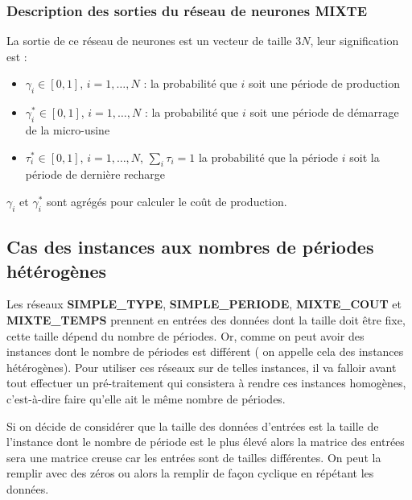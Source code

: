 \subsubsection{Description des sorties du réseau de neurones \textbf{MIXTE}}
La sortie de ce réseau de neurones est un vecteur de taille $3N$, leur signification est :
\begin{itemize}[label=$\square$]
	\item $\gamma_i\in [0,1]$, $i=1, \dots, N$ : la probabilité que $i$ soit une période de production
	\item $\gamma_i^*\in [0,1]$, $i=1, \dots, N$ : la probabilité que $i$ soit une période de démarrage de la micro-usine 
	\item $\tau_i^*\in [0,1]$, $i=1, \dots, N$, $\sum_i \tau_i=1$ la probabilité que la période $i$ soit la période de dernière recharge
\end{itemize}
$\gamma_i$ et $\gamma_i^*$ sont agrégés pour calculer le coût de production.

\subsection{Cas des instances aux nombres de périodes hétérogènes}

Les réseaux \textbf{SIMPLE\_TYPE}, \textbf{SIMPLE\_PERIODE}, \textbf{MIXTE\_COUT} et \textbf{MIXTE\_TEMPS} prennent en entrées des données dont la taille doit être fixe, cette taille dépend du nombre de périodes. Or, comme on peut avoir des instances dont le nombre de périodes est différent ( on appelle cela des instances hétérogènes). Pour utiliser ces réseaux sur de telles instances, il va falloir avant tout effectuer un pré-traitement qui consistera à rendre ces instances homogènes, c'est-à-dire faire qu'elle ait le même nombre de périodes. 

Si on décide de considérer que la taille des données d'entrées est la taille de l'instance dont le nombre de période est le plus élevé alors la matrice des entrées sera une matrice creuse car les entrées sont de tailles différentes. On peut la remplir avec des zéros ou alors la remplir de façon cyclique en répétant les données.

